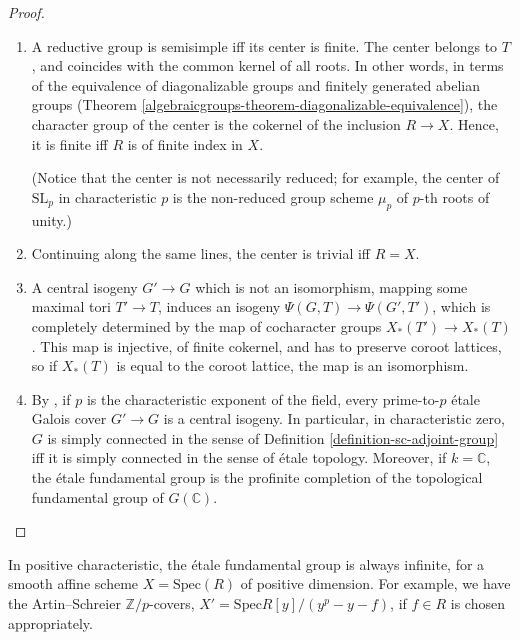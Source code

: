 \begin{proof}
\begin{enumerate}
 \item A reductive group is semisimple iff its center is finite. The center belongs to $T$, and coincides with the common kernel of all roots. In other words, in terms of the equivalence of diagonalizable groups and finitely generated abelian groups (Theorem \ref{algebraicgroups-theorem-diagonalizable-equivalence}), the character group of the center is the cokernel of the inclusion $R\to X$. Hence, it is finite iff $R$ is of finite index in $X$.
 
 (Notice that the center is not necessarily reduced; for example, the center of $\text{SL}_p$ in characteristic $p$ is the non-reduced group scheme $\mu_p$ of $p$-th roots of unity.)
 
 \item Continuing along the same lines, the center is trivial iff $R=X$.
 
 \item A central isogeny $G'\to G$ which is not an isomorphism, mapping some maximal tori $T'\to T$,  induces an isogeny $\Psi(G,T)\to \Psi(G',T')$, which is completely determined by the map of cocharacter groups $X_*(T')\to X_*(T)$. This map is injective, of finite cokernel, and has to preserve coroot lattices, so if $X_*(T)$ is equal to the coroot lattice, the map is an isomorphism.
 
 \item By \cite[Theorem 1]{Brion-Szamuely}, if $p$ is the characteristic exponent of the field, every prime-to-$p$ \'etale Galois cover $G'\to G$ is a central isogeny. In particular, in characteristic zero, $G$ is simply connected in the sense of Definition \ref{definition-sc-adjoint-group} iff it is simply connected in the sense of \'etale topology. Moreover, if $k=\mathbb C$, the \'etale fundamental group is the profinite completion of the topological fundamental group of $G(\mathbb C)$. 
 
\end{enumerate}

\end{proof}


\begin{remark}
\label{remark-sc} 
In positive characteristic, the \'etale fundamental group is always infinite, for a smooth affine scheme $X= \text{Spec}(R)$ of positive dimension. For example, we have the Artin--Schreier $\mathbb Z/p$-covers, $X'=\text{Spec} R[y]/(y^p-y-f)$, if $f\in R$ is chosen appropriately.
\end{remark}





